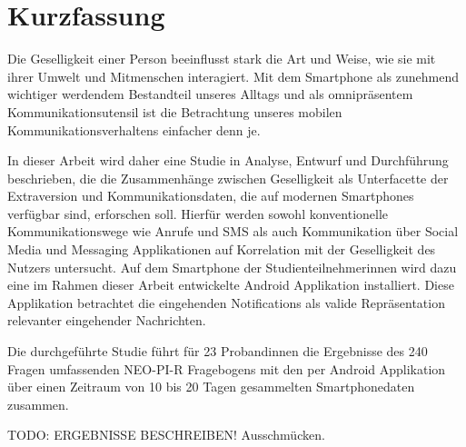 
\chapter*{Kurzfassung}
\label{ch:GermanAbstract}

Die Geselligkeit einer Person beeinflusst stark die Art und Weise, wie sie mit ihrer Umwelt und Mitmenschen interagiert. 
Mit dem Smartphone als zunehmend wichtiger werdendem Bestandteil unseres Alltags und als omnipräsentem Kommunikationsutensil ist 
die Betrachtung unseres mobilen Kommunikationsverhaltens einfacher denn je. 
\par
In dieser Arbeit wird daher eine Studie in Analyse, Entwurf und Durchführung beschrieben, die die Zusammenhänge zwischen Geselligkeit als Unterfacette der Extraversion und Kommunikationsdaten, die auf modernen Smartphones verfügbar sind, erforschen soll. 
Hierfür werden sowohl konventionelle Kommunikationswege wie Anrufe und SMS als auch Kommunikation über Social Media und Messaging Applikationen auf Korrelation mit der Geselligkeit des Nutzers untersucht.
Auf dem Smartphone der Studienteilnehmerinnen wird dazu eine im Rahmen dieser Arbeit entwickelte Android Applikation installiert.
Diese Applikation betrachtet die eingehenden Notifications als valide Repräsentation relevanter eingehender Nachrichten.
\par
Die durchgeführte Studie führt für 23 Probandinnen die Ergebnisse des 240 Fragen umfassenden NEO-PI-R Fragebogens mit den per Android Applikation über einen Zeitraum von 10 bis 20 Tagen gesammelten Smartphonedaten zusammen.
\par
TODO: ERGEBNISSE BESCHREIBEN! Ausschmücken.
 



